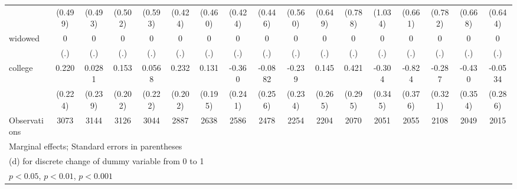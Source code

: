 {\begin{tabular}{l*{16}{c}}
                    &     (0.499)         &     (0.493)         &     (0.502)         &     (0.593)         &     (0.424)         &     (0.460)         &     (0.424)         &     (0.446)         &     (0.560)         &     (0.649)         &     (0.788)         &     (1.034)         &     (0.661)         &     (0.782)         &     (0.668)         &     (0.644)         \\
[1em]
widowed             &           0         &           0         &           0         &           0         &           0         &           0         &           0         &           0         &           0         &           0         &           0         &           0         &           0         &           0         &           0         &           0         \\
                    &         (.)         &         (.)         &         (.)         &         (.)         &         (.)         &         (.)         &         (.)         &         (.)         &         (.)         &         (.)         &         (.)         &         (.)         &         (.)         &         (.)         &         (.)         &         (.)         \\
[1em]
college             &       0.220         &      0.0281         &       0.153         &      0.0568         &       0.232         &       0.131         &      -0.360         &     -0.0882         &      -0.239         &       0.145         &       0.421         &      -0.304         &      -0.824\sym{*}  &      -0.287         &      -0.430         &     -0.0534         \\
                    &     (0.224)         &     (0.239)         &     (0.202)         &     (0.222)         &     (0.202)         &     (0.195)         &     (0.241)         &     (0.256)         &     (0.234)         &     (0.265)         &     (0.295)         &     (0.345)         &     (0.376)         &     (0.321)         &     (0.354)         &     (0.286)         \\
\hline
Observations        &        3073         &        3144         &        3126         &        3044         &        2887         &        2638         &        2586         &        2478         &        2254         &        2204         &        2070         &        2051         &        2055         &        2108         &        2049         &        2015         \\
\hline\hline
\multicolumn{17}{l}{\footnotesize Marginal effects; Standard errors in parentheses}\\
\multicolumn{17}{l}{\footnotesize  (d) for discrete change of dummy variable from 0 to 1}\\
\multicolumn{17}{l}{\footnotesize \sym{*} \(p<0.05\), \sym{**} \(p<0.01\), \sym{***} \(p<0.001\)}\\
\end{tabular}
}
